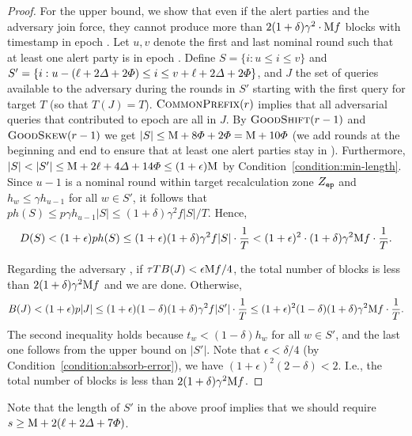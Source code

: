 \begin{proof}
    For the upper bound, we show that even if the alert parties and the adversary join force, they cannot produce more than $2(1 + \delta)\gamma^2 \cdot \mathrm{M} f$ blocks with timestamp in epoch \epoch.
    Let $u, v$ denote the first and last nominal round such that at least one alert party is in epoch \epoch.
    Define $S = \{ i : u \le i \le v \}$ and $S' = \{i : u - (\ell + 2\varDelta + 2\varPhi) \le i \le v + \ell + 2\varDelta + 2\varPhi \}$, and $J$ the set of queries available to the adversary during the rounds in $S'$ starting with the first query for target $T$ (so that $T(J) = T$).
    $\textsc{CommonPrefix}(r)$ implies that all adversarial queries that contributed to epoch \epoch are all in $J$.
    By $\textsc{GoodShift}(r - 1)$ and $\textsc{GoodSkew}(r - 1)$ we get $|S| \le \mathrm{M} + 8\varPhi + 2\varPhi = \mathrm{M} + 10\varPhi$ (we add \maxskew rounds at the beginning and end to ensure that at least one alert parties stay in \epoch).
    Furthermore, $|S| < |S'| \le \mathrm{M} + 2\ell + 4\varDelta + 14\varPhi \le (1 + \epsilon) \mathrm{M}$ by Condition~\eqref{condition:min-length}.
    Since $u - 1$ is a nominal round within target recalculation zone $Z_\mathtt{ep}$ and $h_w \le \gamma h_{u - 1}$ for all $w \in S'$, it follows that $p h(S) \le p \gamma h_{u  -1} |S| \le (1 + \delta) \gamma^2 f|S| / T$.
    Hence,
    \[ D(S) < (1 + \epsilon) p h(S) \le (1 + \epsilon) (1 + \delta) \gamma^2 f |S| \cdot \frac{1}{T} < (1 + \epsilon)^2 \cdot  (1 + \delta) \gamma^2 \mathrm{M} f \cdot \frac{1}{T}. \]

    Regarding the adversary \adv, if $\tau T B(J) < \epsilon \mathrm{M} f / 4$, the total number of blocks is less than $2(1 + \delta) \gamma^2 \mathrm{M} f$ and we are done.
    Otherwise,
    \[ B(J) < (1 + \epsilon) p |J| \le (1 + \epsilon) (1 - \delta) (1 + \delta) \gamma^2 f |S'| \cdot \frac{1}{T} \le (1 + \epsilon)^2 (1 - \delta) (1 + \delta)\gamma^2 \mathrm{M} f \cdot \frac{1}{T}. \]
    The second inequality holds because $t_w < (1 - \delta) h_w$ for all $w \in S'$, and the last one follows from the upper bound on $|S'|$.
    Note that $\epsilon < \delta / 4$ (by Condition~\eqref{condition:absorb-error}), we have $(1 + \epsilon)^2 (2 - \delta) < 2$.
    I.e., the total number of blocks is less than $2(1 + \delta)\gamma^2 \mathrm{M} f$.
\end{proof}

Note that the length of $S'$ in the above proof implies that we should require $s \ge \mathrm{M} + 2(\ell + 2\varDelta + 7\varPhi)$.

